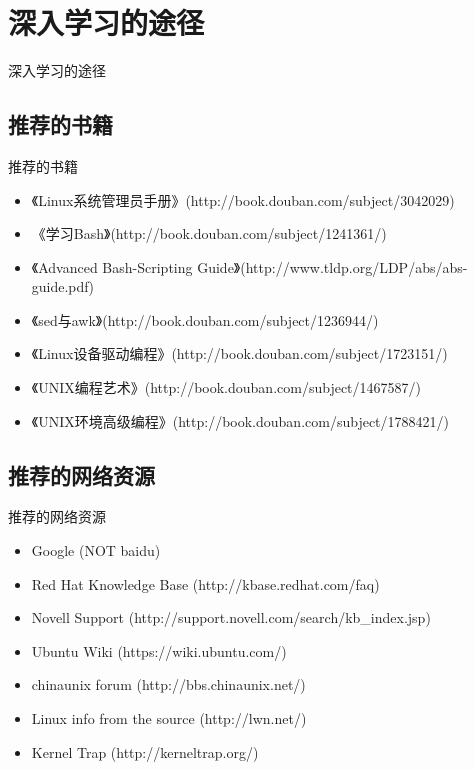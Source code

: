 \section{深入学习的途径}
\begin{frame}{深入学习的途径}
\tableofcontents[currentsection]
\end{frame}

\subsection{推荐的书籍}
\begin{frame}{推荐的书籍}
\begin{itemize}
\item 《Linux系统管理员手册》(http://book.douban.com/subject/3042029)
\item 《学习Bash》(http://book.douban.com/subject/1241361/)
\item 《Advanced Bash-Scripting Guide》(http://www.tldp.org/LDP/abs/abs-guide.pdf)
\item 《sed与awk》(http://book.douban.com/subject/1236944/)
\item 《Linux设备驱动编程》(http://book.douban.com/subject/1723151/)
\item 《UNIX编程艺术》(http://book.douban.com/subject/1467587/)
\item 《UNIX环境高级编程》(http://book.douban.com/subject/1788421/)
\end{itemize}
\end{frame}

\subsection{推荐的网络资源}
\begin{frame}{推荐的网络资源}
\begin{itemize}
\item Google (NOT baidu)
\item Red Hat Knowledge Base (http://kbase.redhat.com/faq)
\item Novell Support (http://support.novell.com/search/kb\_index.jsp)
\item Ubuntu Wiki (https://wiki.ubuntu.com/)
\item chinaunix forum (http://bbs.chinaunix.net/)
\item Linux info from the source (http://lwn.net/)
\item Kernel Trap (http://kerneltrap.org/)
\end{itemize}
\end{frame}

